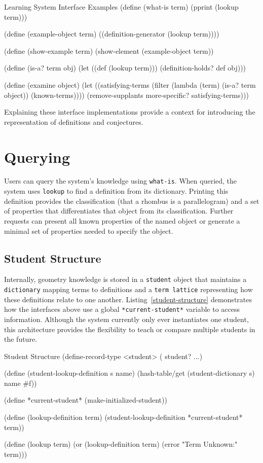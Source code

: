 \begin{code-example}
[label=l-interface]
{Learning System Interface Examples}
(define (what-is term)
  (pprint (lookup term)))

(define (example-object term)
  ((definition-generator (lookup term))))

(define (show-example term)
    (show-element (example-object term))

(define (is-a? term obj)
  (let ((def (lookup term)))
    (definition-holds? def obj)))

(define (examine object)
  (let ((satisfying-terms
         (filter (lambda (term) (is-a? term object))
           (known-terms))))
    (remove-supplants more-specific? satisfying-terms)))
\end{code-example}

Explaining these interface implementations provide a context for
introducing the representation of definitions and conjectures.
\enlargethispage*{\baselineskip}

\section{Querying}

Users can query the system's knowledge using \texttt{what-is}. When
queried, the system uses \texttt{lookup} to find a definition from its
dictionary. Printing this definition provides the classification (that
a rhombus is a parallelogram) and a set of properties that
differentiates that object from its classification. Further requests
can present all known properties of the named object or generate a
minimal set of properties needed to specify the object.

\subsection{Student Structure}

Internally, geometry knowledge is stored in a \texttt{student} object
that maintains a \texttt{dictionary} mapping terms to definitions and
a \texttt{term lattice} representing how these definitions relate to
one another. Listing~\ref{student-structure} demonstrates how the
interfaces above use a global \texttt{*current-student*} variable to
access information. Although the system currently only ever
instantiates one student, this architecture provides the flexibility
to teach or compare multiple students in the future.

\begin{code-listing}
[label=student-structure]
{Student Structure}
(define-record-type <student>
  (%
  student? ...)

(define (student-lookup-definition s name)
  (hash-table/get (student-dictionary s) name #f))

(define *current-student* (make-initialized-student))

(define (lookup-definition term)
  (student-lookup-definition *current-student* term))

(define (lookup term)
  (or (lookup-definition term) (error "Term Unknown:" term)))
\end{code-listing}

